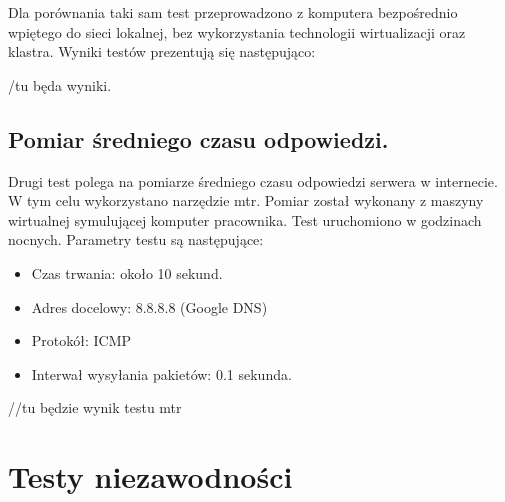 \documentclass[pl,final,oneside]{mgr} %
\begin{document}
Dla porównania taki sam test przeprowadzono z komputera bezpośrednio wpiętego do sieci lokalnej, bez wykorzystania technologii wirtualizacji oraz klastra. Wyniki testów prezentują się następująco:

/tu będa wyniki.

\subsection{Pomiar średniego czasu odpowiedzi.}
Drugi test polega na pomiarze średniego czasu odpowiedzi serwera w internecie. W tym celu wykorzystano narzędzie mtr. Pomiar został wykonany z maszyny wirtualnej symulującej komputer pracownika. Test uruchomiono w godzinach nocnych. Parametry testu są następujące:
\begin{itemize}
	\item Czas trwania: około 10 sekund.
	\item Adres docelowy: 8.8.8.8 (Google DNS)
	\item Protokół: ICMP
	\item Interwał wysyłania pakietów: 0.1 sekunda.
\end{itemize}

//tu będzie wynik testu mtr





\section{Testy niezawodności}
\end{document}
